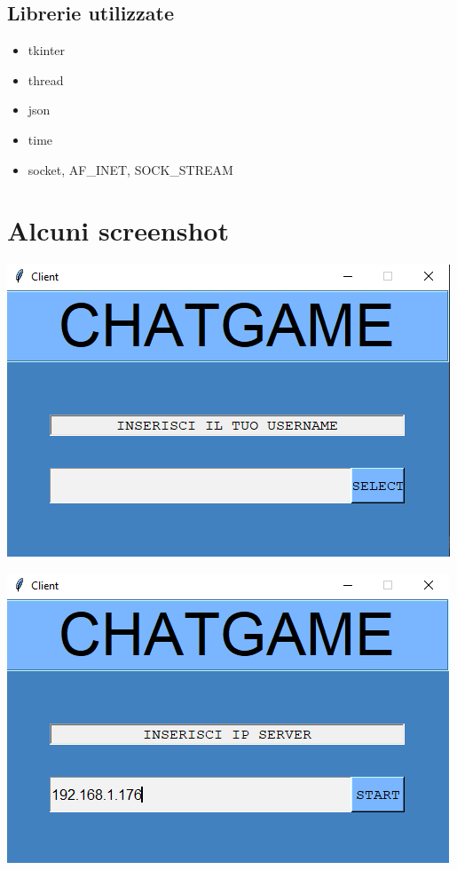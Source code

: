 \documentclass[a4paper,12pt]{report}
\begin{document}
\section{Librerie utilizzate}	

\begin{itemize}
    \item tkinter
    
	\item thread
	
	\item json
    
    \item time
	
	\item socket, AF\_INET, SOCK\_STREAM
\end{itemize}

\chapter{Alcuni screenshot}

\includegraphics[width=\textwidth]{client_insertUsername.png}

\newpage

\includegraphics[width=\textwidth]{client_insertIP.png}
\end{document}
